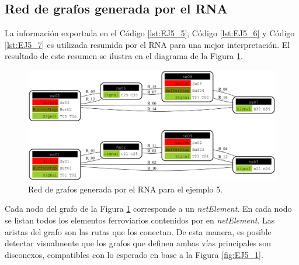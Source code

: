 \subsection{Red de grafos generada por el RNA}

	La información exportada en el Código \ref{lst:EJ5_5}, Código \ref{lst:EJ5_6} y Código \ref{lst:EJ5_7} es utilizada resumida por el RNA para una mejor interpretación. El resultado de este resumen se ilustra en el diagrama de la Figura \ref{fig:EJ5_8}.
	
	\begin{figure}[H]
		\centering
		\includegraphics[width=1\textwidth]{Figuras/Graph_5}
		\centering\caption{Red de grafos generada por el RNA para el ejemplo 5.}
		\label{fig:EJ5_8}
	\end{figure}
	
	Cada nodo del grafo de la Figura \ref{fig:EJ5_8} corresponde a un \textit{netElement}. En cada nodo se listan todos los elementos ferroviarios contenidos por en \textit{netElement}. Las aristas del grafo son las rutas que los conectan. De esta manera, es posible detectar visualmente que los grafos que definen ambas vías principales son disconexos, compatibles con lo esperado en base a la Figura \ref{fig:EJ5_1}.